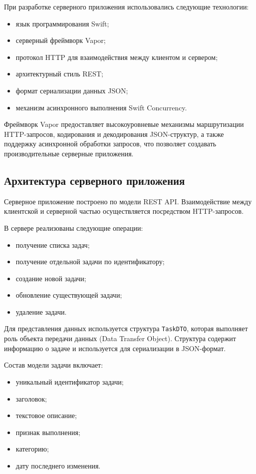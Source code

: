 \documentclass[14pt,a4paper]{extarticle}
\begin{document}
При разработке серверного приложения использовались следующие технологии:

\begin{itemize}
    \item язык программирования Swift;
    \item серверный фреймворк Vapor;
    \item протокол HTTP для взаимодействия между клиентом и сервером;
    \item архитектурный стиль REST;
    \item формат сериализации данных JSON;
    \item механизм асинхронного выполнения Swift Concurrency.
\end{itemize}

Фреймворк Vapor предоставляет высокоуровневые механизмы маршрутизации HTTP-запросов, кодирования и декодирования JSON-структур, а также поддержку асинхронной обработки запросов, что позволяет создавать производительные серверные приложения.

\subsection{Архитектура серверного приложения}

Серверное приложение построено по модели REST API. Взаимодействие между клиентской и серверной частью осуществляется посредством HTTP-запросов.

В сервере реализованы следующие операции:

\begin{itemize}
    \item получение списка задач;
    \item получение отдельной задачи по идентификатору;
    \item создание новой задачи;
    \item обновление существующей задачи;
    \item удаление задачи.
\end{itemize}

Для представления данных используется структура \texttt{TaskDTO}, которая выполняет роль объекта передачи данных (Data Transfer Object). Структура содержит информацию о задаче и используется для сериализации в JSON-формат.

Состав модели задачи включает:

\begin{itemize}
    \item уникальный идентификатор задачи;
    \item заголовок;
    \item текстовое описание;
    \item признак выполнения;
    \item категорию;
    \item дату последнего изменения.
\end{itemize}
\end{document}
